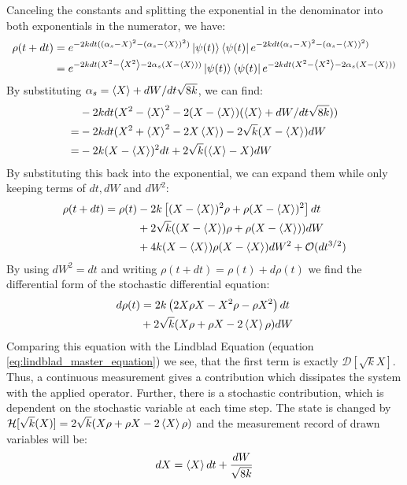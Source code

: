 Canceling the constants and splitting the exponential in the denominator into both exponentials in the numerator, we have:
\begin{align*}
    \rho(t + dt) &= e^{-2k dt ((\alpha_s - X)^2 - (\alpha_s - \expval{X})^2)} \ket{\psi(t)}\bra{\psi(t)}e^{-2k dt (\alpha_s - X)^2 - (\alpha_s - \expval{X})^2)} \\
            &= e^{-2kdt (X^2 - \expval{X^2} - 2 \alpha_s(X - \expval{X}))}\ket{\psi(t)}\bra{\psi(t)}  e^{-2kdt (X^2 - \expval{X^2} - 2 \alpha_s(X - \expval{X}))}
\end{align*}
By substituting $\alpha_s = \expval{X} + {dW}/{dt \sqrt{8k}}$, we can find:
\begin{align*}
       &-2kdt (X^2 - \expval{X}^2 - 2(X - \expval{X})(\expval{X} + {dW}/{dt \sqrt{8k}})) \\
     = &-2kdt(X^2 + \expval{X}^2 - 2 X \expval{X}) - 2\sqrt{k}(X -\expval{X})dW \\
     = &-2k(X - \expval{X})^2dt + 2\sqrt{k}(\expval{X} - X)dW
\end{align*}
By substituting this back into the exponential, we can expand them while only keeping terms of $dt, dW$ and $dW^2$:
\begin{align*}
    \rho(t+ dt) = \rho(t) &- 2k\left[(X - \expval{X})^2\rho + \rho(X - \expval{X})^2 \right]dt \\
                          &+ 2\sqrt{k}((X -\expval{X})\rho + \rho(X -\expval{X}))dW \\
                          &+ 4k (X -\expval{X})\rho (X -\expval{X}) dW^2 + \mathcal{O}(dt^{3/2})
\end{align*}
By using $dW^2 = dt$ and writing $\rho(t +dt) = \rho(t) + d\rho(t)$ we find the differential form of the stochastic differential equation:
\begin{align}
    d\rho(t) &=  2k\left(2 X\rho X - X^2\rho - \rho X^2\right)dt \\
                          &+ 2\sqrt{k}(X\rho + \rho X - 2 \expval{X}\rho)dW
\end{align}
Comparing this equation with the Lindblad Equation (equation \ref{eq:lindblad_master_equation}) we see, that the first term is exactly $\mathcal{D}[\sqrt{k}X]$. Thus, a continuous measurement gives a contribution which dissipates the system with the applied operator. Further, there is a stochastic contribution, which is dependent on the stochastic variable at each time step.  The state is changed by $\mathcal{H}[\sqrt{k}(X)]=2\sqrt{k}(X\rho + \rho X - 2 \expval{X}\rho)$ and the measurement record of drawn variables will be:
\begin{equation}
    dX = \expval{X}dt + \frac{dW}{\sqrt{8k}}
\end{equation}


